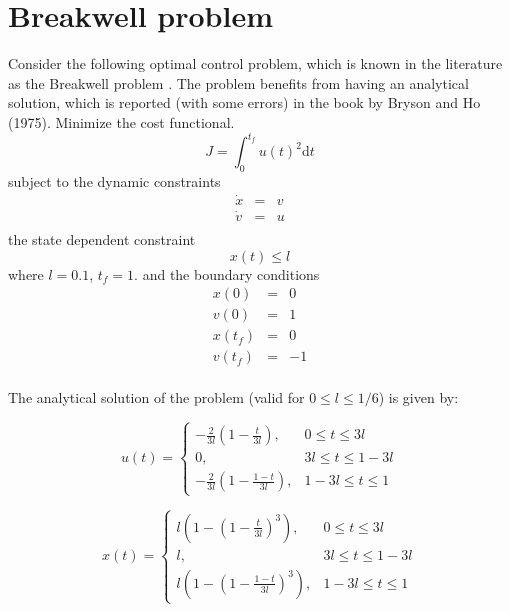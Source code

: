 \documentclass[a4paper,11pt]{report}    %
\begin{document}
\section{Breakwell problem}

Consider the following optimal control problem, which is known in the literature
as the Breakwell problem \cite{Bryson:75}. The problem benefits from having an analytical
solution, which is reported (with some errors) in the book by Bryson and Ho (1975). 
Minimize the cost functional.
\begin{equation}
  J = \int_{0}^{t_f} u(t)^2 \mathrm{d}t
\end{equation}
subject to the dynamic constraints
\begin{equation}
  \begin{array}{lcl}
    \dot x & = & v \\
    \dot v & = & u \\
  \end{array}
\end{equation}
the state dependent constraint
\begin{equation}
    x(t) \le l
\end{equation}
where $l = 0.1$, $t_f=1$.
and the boundary conditions
\begin{equation}
  \begin{array}{lcl}
    x(0) & = & 0 \\
    v(0) & = & 1 \\
    x(t_f) & = & 0 \\
    v(t_f) & = & -1 \\
  \end{array}
\end{equation}

The analytical solution of the problem (valid for $0\le l \le 1/6$) is given by:

\begin{equation}
 u(t) = \left\{  \begin{matrix} -\frac{2}{3l}(1-\frac{t}{3l}), & 0 \le t \le 3l \\ 0, & 3l \le t \le 1-3l \\ -\frac{2}{3l}(1-\frac{1-t}{3l}),  & 1-3l \le t \le 1 \end{matrix}  \right.
\end{equation}

\begin{equation}
 x(t) = \left\{  \begin{matrix} l\left( 1 -  \left(1-\frac{t}{3l}\right)^3 \right), & 0 \le t \le 3l \\ l, & 3l \le t \le 1-3l \\ l\left( 1 -  \left(1-\frac{1-t}{3l}\right)^3 \right),   & 1-3l \le t \le 1 \end{matrix}  \right.
\end{equation}
\end{document}
